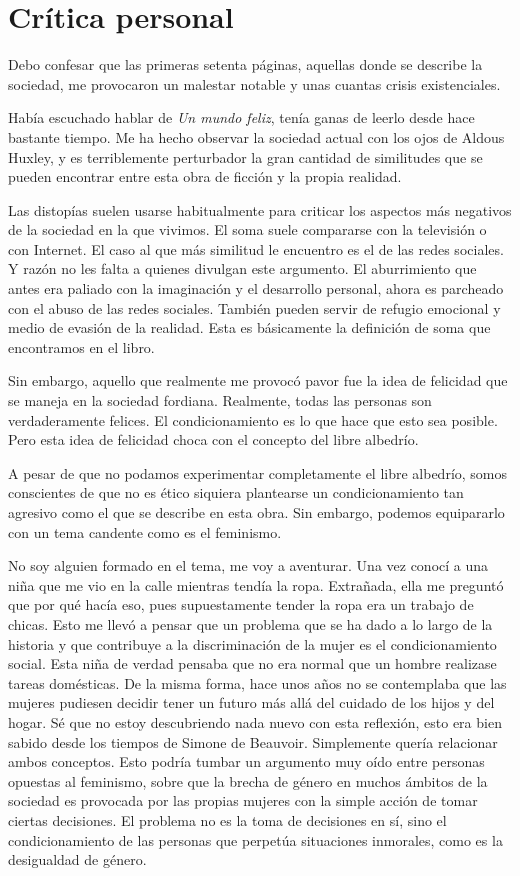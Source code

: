 \documentclass{article}
\begin{document}
\newpage

\section{Crítica personal}

Debo confesar que las primeras setenta páginas, aquellas donde se describe la sociedad, me provocaron un malestar notable y unas cuantas crisis existenciales.

Había escuchado hablar de \textit{Un mundo feliz}, tenía ganas de leerlo desde hace bastante tiempo. Me ha hecho observar la sociedad actual con los ojos de Aldous Huxley, y es terriblemente perturbador la gran cantidad de similitudes que se pueden encontrar entre esta obra de ficción y la propia realidad.

Las distopías suelen usarse habitualmente para criticar los aspectos más negativos de la sociedad en la que vivimos. El soma suele compararse con la televisión o con Internet. El caso al que más similitud le encuentro es el de las redes sociales. Y razón no les falta a quienes divulgan este argumento. El aburrimiento que antes era paliado con la imaginación y el desarrollo personal, ahora es parcheado con el abuso de las redes sociales. También pueden servir de refugio emocional y medio de evasión de la realidad. Esta es básicamente la definición de soma que encontramos en el libro.

Sin embargo, aquello que realmente me provocó pavor fue la idea de felicidad que se maneja en la sociedad fordiana. Realmente, todas las personas son verdaderamente felices. El condicionamiento es lo que hace que esto sea posible. Pero esta idea de felicidad choca con el concepto del libre albedrío.

A pesar de que no podamos experimentar completamente el libre albedrío, somos conscientes de que no es ético siquiera plantearse un condicionamiento tan agresivo como el que se describe en esta obra. Sin embargo, podemos equipararlo con un tema candente como es el feminismo.

No soy alguien formado en el tema, me voy a aventurar. Una vez conocí a una niña que me vio en la calle mientras tendía la ropa. Extrañada, ella me preguntó que por qué hacía eso, pues supuestamente tender la ropa era un trabajo de chicas. Esto me llevó a pensar que un problema que se ha dado a lo largo de la historia y que contribuye a la discriminación de la mujer es el condicionamiento social. Esta niña de verdad pensaba que no era normal que un hombre realizase tareas domésticas. De la misma forma, hace unos años no se contemplaba que las mujeres pudiesen decidir tener un futuro más allá del cuidado de los hijos y del hogar. Sé que no estoy descubriendo nada nuevo con esta reflexión, esto era bien sabido desde los tiempos de Simone de Beauvoir. Simplemente quería relacionar ambos conceptos. Esto podría tumbar un argumento muy oído entre personas opuestas al feminismo, sobre que la brecha de género en muchos ámbitos de la sociedad es provocada por las propias mujeres con la simple acción de tomar ciertas decisiones. El problema no es la toma de decisiones en sí, sino el condicionamiento de las personas que perpetúa situaciones inmorales, como es la desigualdad de género.
\end{document}
